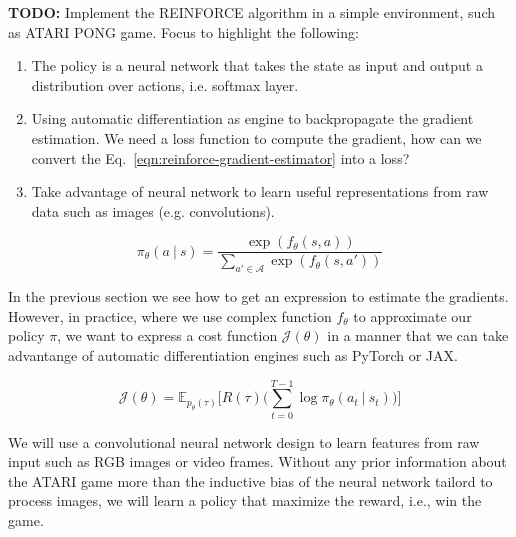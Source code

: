 \textbf{TODO:} Implement the REINFORCE algorithm in a simple environment, such as ATARI PONG game. Focus to highlight the following:

\begin{enumerate}
    \item The policy is a neural network that takes the state as input and output a distribution over actions, i.e. softmax layer.  
    \item Using automatic differentiation as engine to backpropagate the gradient estimation. We need a loss function to compute the gradient, how
    can we convert the Eq.~\ref{eqn:reinforce-gradient-estimator} into a loss?
    \item Take advantage of neural network to learn useful representations from raw data such as images (e.g. convolutions).
\end{enumerate}

\begin{equation}\label{eqn:neural-softmax-policies}
    \pi_{\theta}(a~|~s) = \frac{\exp(f_{\theta}(s, a))}{\sum_{a'\in\mathcal{A}}\exp(f_{\theta}(s, a'))}
\end{equation}

\noindent In the previous section we see how to get an expression to estimate the gradients. However, in practice, where we use complex function
$f_{\theta}$ to approximate our policy $\pi$, we want to express a cost
function $\mathcal{J}(\theta)$ in a manner that we can take advantange of 
automatic differentiation engines such as PyTorch or JAX.

\begin{equation}\label{eqn:reinforce-gradient-estimator-cost}
    \mathcal{J}(\theta) = \mathbb{E}_{p_{\theta}(\tau)}\bigg[R(\tau)\bigg(\sum_{t=0}^{T-1} \log \pi_{\theta} (a_t~|~s_t) \bigg)\bigg] 
\end{equation}

\noindent We will use a convolutional neural network design to learn features from raw input such as RGB images or video frames. Without any prior information about the ATARI game more than the inductive bias of the neural network tailord to process images, we will learn a policy that maximize the reward, i.e., win the game. \\


